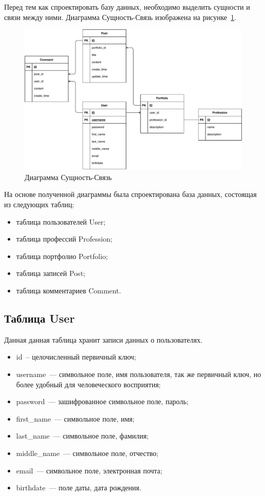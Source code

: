 Перед тем как спроектировать базу данных, необходимо выделить сущности и связи между ними. Диаграмма Сущность-Связь изображена на рисунке~\ref{img:er1}.

\begin{figure}[H]
    \centering
    \includegraphics[scale=0.65]{pdf/er1.pdf}
    \caption{Диаграмма Сущность-Связь}\label{img:er1}
\end{figure}

На основе полученной диаграммы была спроектирована база данных, состоящая из следующих таблиц:
\begin{itemize}
    \item таблица пользователей User;
    \item таблица профессий Profession;
    \item таблица портфолио Portfolio;
    \item таблица записей Post;
    \item таблица комментариев Comment.
\end{itemize}

\subsection{Таблица User}%
\label{sub:tablitsa_user}
Данная данная таблица хранит записи данных о пользователях.
\begin{itemize}
    \item id~-- целочисленный первичный ключ;
    \item username~--- символьное поле, имя пользователя, так же первичный ключ, но более удобный для человеческого восприятия;
    \item password~--- зашифрованное символьное поле, пароль;
    \item first\_name~--- символьное поле, имя;
    \item last\_name~--- символьное поле, фамилия;
    \item middle\_name~--- символьное поле, отчество;
    \item email~--- символьное поле, электронная почта;
    \item birthdate~--- поле даты, дата рождения.
\end{itemize}

